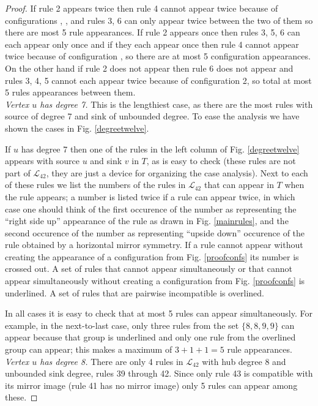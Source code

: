 \documentclass[11pt]{article}
\newcommand{\m}{\mathcal}
\begin{document}
\begin{proof}
If rule 2 appears twice then rule 4 cannot appear twice because of configurations \FtFfSoFfFtFfSoFf, \FtFfSoFsFtSfSoFf, \FtFsSoFsFtSfSoSf{} and rules 3, 6 can only appear twice between the two of them so there are most 5 rule appearances. If rule 2 appears once then rules 3, 5, 6 can each appear only once and if they each appear once then rule 4 cannot appear twice because of configuration \FtFsSoSfFtFsSoSf, so there are at most 5 configuration appearances. On the other hand if rule 2 does not appear then rule 6 does not appear and rules 3, 4, 5 cannot each appear twice because of configuration 2, so total at most 5 rules appearances between them.\\

\noindent \emph{Vertex $u$ has degree 7.} This is the lengthiest case, as there are the most rules with source of degree 7 and sink of unbounded degree. To ease the analysis we have shown the cases in Fig$.$ \ref{degreetwelve}. 

If $u$ has degree 7 then one of the rules in the left column of Fig$.$ \ref{degreetwelve} appears with source $u$ and sink $v$ in $T$, as is easy to check (these rules are not part of $\m{L}_{42}$, they are just a device for organizing the case analysis).
Next to each of these rules we list the numbers of the rules in $\m{L}_{42}$ that can appear in $T$ when the rule appears; a number is listed twice if a rule can appear twice, in which case one should think of the first occurence of the number as representing the ``right side up'' appearance of the rule as drawn in Fig$.$ \ref{mainrules}, and the second occurence of the number as representing ``upside down'' occurence of the rule obtained by a horizontal mirror symmetry. If a rule cannot appear without creating the appearance of a configuration from Fig$.$ \ref{proofconfs} its number is crossed out. A set of rules that cannot appear simultaneously or that cannot appear simultaneously without creating a configuration from Fig$.$ \ref{proofconfs} is underlined. A set of rules that are pairwise incompatible is overlined. 

In all cases it is easy to check that at most 5 rules can appear simultaneously. For example, in the next-to-last case, only three rules from the set $\{8, 8, 9, 9\}$ can appear because that group is underlined and only one rule from the overlined group can appear; this makes a maximum of $3 + 1 + 1 = 5$ rule appearances.\\ 

\noindent \emph{Vertex $u$ has degree 8.} There are only 4 rules in $\m{L}_{42}$ with hub degree 8 and unbounded sink degree, rules 39 through 42. Since only rule 43 is compatible with its mirror image (rule 41 has no mirror image) only 5 rules can appear among these.

\end{proof}
\end{document}
